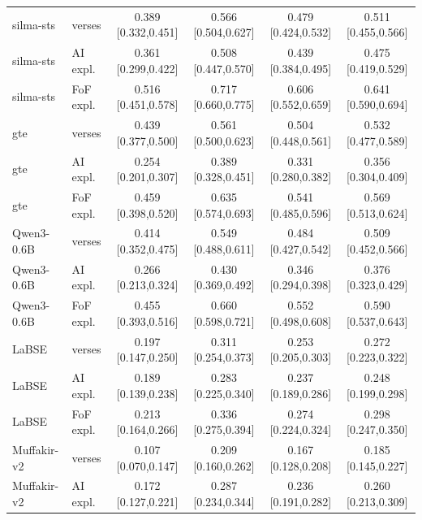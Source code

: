 \begin{tabular}{ll cccc}
silma-sts & verses & 0.389 \scriptsize [0.332,0.451] & 0.566 \scriptsize [0.504,0.627] & 0.479 \scriptsize [0.424,0.532] & 0.511 \scriptsize [0.455,0.566] \\
silma-sts & AI expl. & 0.361 \scriptsize [0.299,0.422] & 0.508 \scriptsize [0.447,0.570] & 0.439 \scriptsize [0.384,0.495] & 0.475 \scriptsize [0.419,0.529] \\
silma-sts & FoF expl. & 0.516 \scriptsize [0.451,0.578] & 0.717 \scriptsize [0.660,0.775] & 0.606 \scriptsize [0.552,0.659] & 0.641 \scriptsize [0.590,0.694] \\
gte & verses & 0.439 \scriptsize [0.377,0.500] & 0.561 \scriptsize [0.500,0.623] & 0.504 \scriptsize [0.448,0.561] & 0.532 \scriptsize [0.477,0.589] \\
gte & AI expl. & 0.254 \scriptsize [0.201,0.307] & 0.389 \scriptsize [0.328,0.451] & 0.331 \scriptsize [0.280,0.382] & 0.356 \scriptsize [0.304,0.409] \\
gte & FoF expl. & 0.459 \scriptsize [0.398,0.520] & 0.635 \scriptsize [0.574,0.693] & 0.541 \scriptsize [0.485,0.596] & 0.569 \scriptsize [0.513,0.624] \\
Qwen3-0.6B & verses & 0.414 \scriptsize [0.352,0.475] & 0.549 \scriptsize [0.488,0.611] & 0.484 \scriptsize [0.427,0.542] & 0.509 \scriptsize [0.452,0.566] \\
Qwen3-0.6B & AI expl. & 0.266 \scriptsize [0.213,0.324] & 0.430 \scriptsize [0.369,0.492] & 0.346 \scriptsize [0.294,0.398] & 0.376 \scriptsize [0.323,0.429] \\
Qwen3-0.6B & FoF expl. & 0.455 \scriptsize [0.393,0.516] & 0.660 \scriptsize [0.598,0.721] & 0.552 \scriptsize [0.498,0.608] & 0.590 \scriptsize [0.537,0.643] \\
LaBSE & verses & 0.197 \scriptsize [0.147,0.250] & 0.311 \scriptsize [0.254,0.373] & 0.253 \scriptsize [0.205,0.303] & 0.272 \scriptsize [0.223,0.322] \\
LaBSE & AI expl. & 0.189 \scriptsize [0.139,0.238] & 0.283 \scriptsize [0.225,0.340] & 0.237 \scriptsize [0.189,0.286] & 0.248 \scriptsize [0.199,0.298] \\
LaBSE & FoF expl. & 0.213 \scriptsize [0.164,0.266] & 0.336 \scriptsize [0.275,0.394] & 0.274 \scriptsize [0.224,0.324] & 0.298 \scriptsize [0.247,0.350] \\
Muffakir-v2 & verses & 0.107 \scriptsize [0.070,0.147] & 0.209 \scriptsize [0.160,0.262] & 0.167 \scriptsize [0.128,0.208] & 0.185 \scriptsize [0.145,0.227] \\
Muffakir-v2 & AI expl. & 0.172 \scriptsize [0.127,0.221] & 0.287 \scriptsize [0.234,0.344] & 0.236 \scriptsize [0.191,0.282] & 0.260 \scriptsize [0.213,0.309] \\

\end{tabular}
